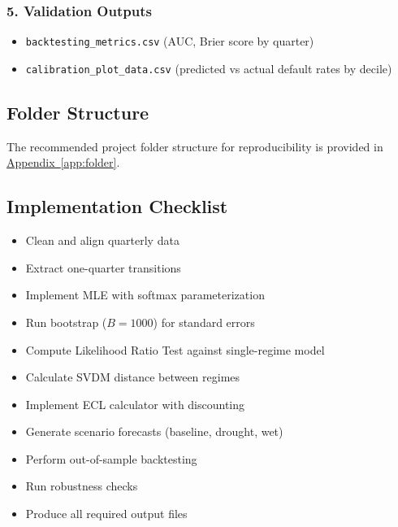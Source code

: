 \documentclass[12pt,a4paper]{article}
\begin{document}
\subsubsection*{5. Validation Outputs}
\begin{itemize}[noitemsep]
    \item \texttt{backtesting\_metrics.csv} (AUC, Brier score by quarter)
    \item \texttt{calibration\_plot\_data.csv} (predicted vs actual default rates by decile)
\end{itemize}

\subsection{Folder Structure}

The recommended project folder structure for reproducibility is provided in \hyperref[app:folder]{Appendix~\ref*{app:folder}}.

\subsection{Implementation Checklist}

\begin{itemize}[noitemsep]
    \item[$\square$] Clean and align quarterly data
    \item[$\square$] Extract one-quarter transitions
    \item[$\square$] Implement MLE with softmax parameterization
    \item[$\square$] Run bootstrap ($B=1000$) for standard errors
    \item[$\square$] Compute Likelihood Ratio Test against single-regime model
    \item[$\square$] Calculate SVDM distance between regimes
    \item[$\square$] Implement ECL calculator with discounting
    \item[$\square$] Generate scenario forecasts (baseline, drought, wet)
    \item[$\square$] Perform out-of-sample backtesting
    \item[$\square$] Run robustness checks
    \item[$\square$] Produce all required output files
\end{itemize}

\end{document}
